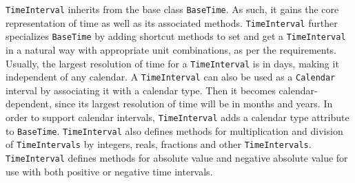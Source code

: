 
{\tt TimeInterval} inherits from the base class {\tt BaseTime}.  As such,
it gains the core representation of time as well as its associated methods.
{\tt TimeInterval} further specializes {\tt BaseTime} by adding shortcut
methods to set and get a {\tt TimeInterval} in a natural way with
appropriate unit combinations, as per the requirements.  Usually, the
largest resolution of time for a {\tt TimeInterval} is in days, making it
independent of any calendar.  A {\tt TimeInterval} can also be used as a
{\tt Calendar} interval by associating it with a calendar type.  Then it
becomes calendar-dependent, since its largest resolution of time will be
in months and years.  In order to support calendar intervals,
{\tt TimeInterval} adds a calendar type attribute to {\tt BaseTime}.
{\tt TimeInterval} also defines methods for multiplication and division
of {\tt TimeIntervals} by integers, reals, fractions and other
{\tt TimeIntervals}.  {\tt TimeInterval} defines methods for absolute
value and negative absolute value for use with both positive or
negative time intervals.
